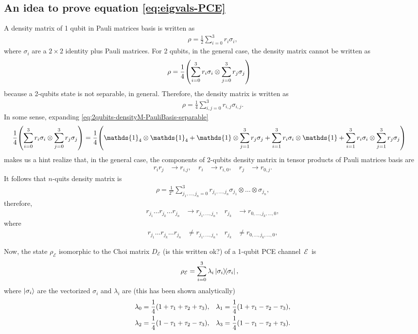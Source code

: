 \documentclass[11pt,dvipsnames]{article} %
\newcommand{\E}{\mathcal{E}}
\newcommand{\1}{\mathds{1}}
\newcommand{\ot}{\otimes}
\begin{document}
\subsection*{An idea to prove equation \eqref{eq:eigvals-PCE}}
A density matrix of 1 qubit in Pauli matrices basis is written as
\begin{align}
\rho=\frac{1}{2}\sum_{i=0}^3r_i\sigma_i,
\end{align}
where $\sigma_i$ are a $2\times2$ identity plus Pauli matrices.
For 2 qubits, in the general case, the density matrix cannot be written as
\begin{align}\label{eq:2qubits-densityM-PauliBasis-separable}
\rho&=\frac{1}{4}\qty(\sum_{i=0}^3r_i\sigma_i
\ot
\sum_{j=0}^3r_j\sigma_j)
\end{align}
because a 2-qubits state is not separable, in general. Therefore, 
the density matrix is written as
\begin{align}
\rho=\frac{1}{4}\sum_{i,j=0}^3r_{i,j}\sigma_{i,j}.
\end{align}
In some sense, expanding 
\eqref{eq:2qubits-densityM-PauliBasis-separable}
\begin{align}
\frac{1}{4}\qty(\sum_{i=0}^3r_i\sigma_i
\ot
\sum_{j=0}^3r_j\sigma_j)
&=\frac{1}{4}\qty(
\1_{4}\ot\1_{4}+\1\ot\sum_{j=1}^3r_j\sigma_j+
\sum_{i=1}^3r_i\sigma_i\ot\1+
\sum_{i=1}^3r_i\sigma_i\ot\sum_{j=1}^3r_j\sigma_j
)
\end{align}
makes us a hint realize that, in the general case, the components
of 2-qubits density matrix in tensor products of Pauli matrices basis are
\begin{align}
r_ir_j&\to r_{i.j},&\ r_i&\to r_{i,0},&\ r_j &\to r_{0,j}.
\end{align}
It follows that $n$-quits density matrix is
\begin{align}
\rho=\frac{1}{2^n}\sum_{j_1,\ldots,j_n=0}^3
r_{j_1,\ldots,j_n}\sigma_{j_1}\ot\ldots\ot\sigma_{j_n},
\end{align}
therefore,
\begin{align}
\label{eq:general-comp-of-density-matrix-in-Pauli-matrices-basis}
r_{j_1}\ldots r_{j_k}\ldots r_{j_n}&\to r_{j_1,\ldots,j_n}, &
r_{j_k}&\to r_{0,\ldots,j_k,\ldots,0},
\end{align}
where 
\begin{align}
r_{j_1}\ldots r_{j_k}\ldots r_{j_n}&\neq r_{j_1,\ldots,j_n}, &
r_{j_k}&\neq r_{0,\ldots,j_k,\ldots,0},
\end{align}

Now, the state $\rho_{\E}$ isomorphic to the Choi matrix $D_{\E}$
(is this written ok?) of a 1-qubit PCE channel~$\E$~is
\begin{align}
\rho_{\E}&=\sum_{i=0}^3\lambda_i \dyad{\sigma_i}{\sigma_i},
\end{align}
where $\ket{\sigma_i}$ are the vectorized $\sigma_i$ and
$\lambda_i$ are (this has been shown analytically)
\begin{align}\label{eq:eigvals-1q-choi}
\lambda_0&=\frac{1}{4}\qty(1+\tau_1+\tau_2+\tau_3), &
\lambda_1&=\frac{1}{4}\qty(1+\tau_1-\tau_2-\tau_3),\nonumber\\
\lambda_2&=\frac{1}{4}\qty(1-\tau_1+\tau_2-\tau_3), &
\lambda_3&=\frac{1}{4}\qty(1-\tau_1-\tau_2+\tau_3).
\end{align}
\end{document}
